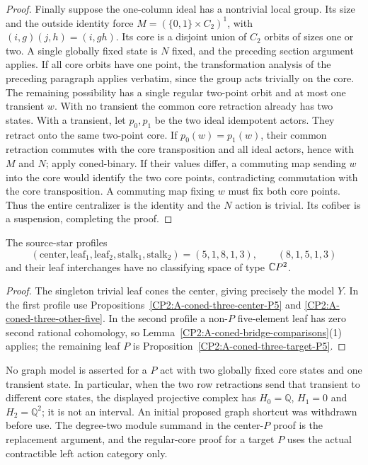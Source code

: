 \begin{proof}
Finally suppose the one-column ideal has a nontrivial local
group. Its size and the outside identity force
$M=(\{0,1\}\times C_2)^1$, with
$(i,g)(j,h)=(i,gh)$. Its core is a disjoint union of $C_2$
orbits of sizes one or two. A single globally fixed state is
$N$ fixed, and the preceding section argument applies. If
all core orbits have one point, the transformation analysis
of the preceding paragraph applies verbatim, since the group
acts trivially on the core. The remaining possibility has a
single regular two-point orbit and at most one transient $w$.
With no transient the common core retraction already has two
states. With a transient, let $p_0,p_1$ be the two ideal
idempotent actors. They retract onto the same two-point core.
If $p_0(w)=p_1(w)$, their common retraction commutes with the
core transposition and all ideal actors, hence with $M$ and
$N$; apply coned-binary. If their values differ, a commuting
map sending $w$ into the core would identify the two core
points, contradicting commutation with the core transposition.
A commuting map fixing $w$ must fix both core points. Thus
the entire centralizer is the identity and the $N$ action is
trivial. Its cofiber is a suspension, completing the proof.
\end{proof}

\begin{corollary}
\label{CP2:A-star-coned-three-five-eight}
The source-star profiles
\[
 (\text{center},\text{leaf}_1,\text{leaf}_2,
   \text{stalk}_1,\text{stalk}_2)
 =(5,1,8,1,3),\qquad(8,1,5,1,3)
\]
and their leaf interchanges have no classifying space of type
$\mathbb{C}P^2$.
\end{corollary}
\begin{proof}
The singleton trivial leaf cones the center, giving precisely
the model $Y$. In the first profile use
Propositions~\ref{CP2:A-coned-three-center-P5} and
\ref{CP2:A-coned-three-other-five}. In the second profile a
non-$P$ five-element leaf has zero second rational cohomology,
so Lemma~\ref{CP2:A-coned-bridge-comparisons}(1) applies;
the remaining leaf $P$ is Proposition~\ref{CP2:A-coned-three-target-P5}.
\end{proof}

\begin{remark*}
No graph model is asserted for a $P$ act with two globally
fixed core states and one transient state. In particular, when
the two row retractions send that transient to different core
states, the displayed projective complex has $H_0=\mathbb Q$,
$H_1=0$ and $H_2=\mathbb Q^2$; it is not an interval. An
initial proposed graph shortcut was withdrawn before use.
The degree-two module summand in the center-$P$ proof is the
replacement argument, and the regular-core proof for a target
$P$ uses the actual contractible left action category only.
\end{remark*}
